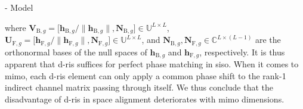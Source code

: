 \documentclass[journal]{IEEEtran}
\begin{document}
\begin{section}{- Model}
\begin{itemize}
		where $\mathbf{V}_{\mathrm{B},g} = \bigl[\mathbf{h}_{\mathrm{B},g}/\lVert \mathbf{h}_{\mathrm{B},g} \rVert, \mathbf{N}_{\mathrm{B},g}\bigr] \in \mathbb{U}^{L \times L}$, $\mathbf{U}_{\mathrm{F},g} = \bigl[\mathbf{h}_{\mathrm{F},g}/\lVert \mathbf{h}_{\mathrm{F},g} \rVert, \mathbf{N}_{\mathrm{F},g}\bigr] \in \mathbb{U}^{L \times L}$, and $\mathbf{N}_{\mathrm{B},g}, \mathbf{N}_{\mathrm{F},g} \in \mathbb{C}^{L \times (L-1)}$ are the orthonormal bases of the null spaces of $\mathbf{h}_{\mathrm{B},g}$ and $\mathbf{h}_{\mathrm{F},g}$, respectively.
		It is thus apparent that \gls{d}-\gls{ris} suffices
		for perfect phase matching in \gls{siso}.
		When it comes to \gls{mimo}, each \gls{d}-\gls{ris} element can only apply a common phase shift to the rank-1 indirect channel matrix passing through itself.
		We thus conclude that the disadvantage of \gls{d}-\gls{ris} in space alignment deteriorates with \gls{mimo} dimensions.
	\end{itemize}







\end{section}
\end{document}
